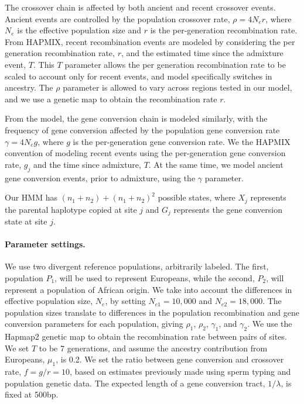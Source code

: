The crossover chain is affected by both ancient and recent crossover events.
Ancient events are controlled by the population crossover rate, $\rho = 4 N_e r$, where $N_e$ is the effective population size and $r$ is the per-generation recombination rate.
From HAPMIX, recent recombination events are modeled by considering the per generation recombination rate, $r$, and the estimated time since the admixture event, $T$.
This $T$ parameter allows the per generation recombination rate to be scaled to account only for recent events, and model specifically switches in ancestry.
The $\rho$ parameter is allowed to vary across regions tested in our model, and we use a genetic map to obtain the recombination rate $r$.

From the \citet{Gay2007} model, the gene conversion chain is modeled similarly, with the frequency of gene conversion affected by the population gene conversion rate $\gamma = 4 N_e g$, where $g$ is the per-generation gene conversion rate.
We the HAPMIX convention of modeling recent events using the per-generation gene conversion rate, $g_j$ and the time since admixture, $T$.
At the same time, we model ancient gene conversion events, prior to admixture, using the $\gamma$ parameter.

Our HMM has $(n_1+n_2)+(n_1+n_2)^2$ possible states, where $X_j$ represents the parental haplotype copied at site $j$ and $G_j$ represents the gene conversion state at site $j$.

\paragraph*{Parameter settings.}
We use two divergent reference populations, arbitrarily labeled.
The first, population $P_1$, will be used to represent Europeans, while the second, $P_2$, will represent a population of African origin.
We take into account the differences in effective population size, $N_e$, by setting $N_{e1} = 10,000$ and $N_{e2} = 18,000$.
The population sizes translate to differences in the population recombination and gene conversion parameters for each population, giving $\rho_1$, $\rho_2$, $\gamma_1$, and $\gamma_2$.
We use the Hapmap2 genetic map\cite{hapmap2007} to obtain the recombination rate between pairs of sites.
We set $T$ to be 7 generations, and assume the ancestry contribution from Europeans, $\mu_1$, is 0.2.
We set the ratio between gene conversion and crossover rate, $f = g / r = 10$, based on estimates previously made using sperm typing\cite{Jeffreys2004} and population genetic\cite{Gay2007} data.
The expected length of a gene conversion tract, $1/\lambda$, is fixed at 500bp.

